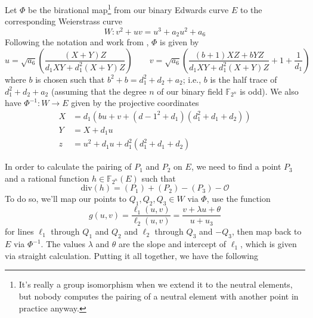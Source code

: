 Let $\Phi$ be the birational map\footnote{It's really a group isomorphism when
    we extend it to the neutral elements, but nobody computes the pairing of a
    neutral element with another point in practice anyway.} from our binary
    Edwards curve $E$ to the corresponding Weierstrass curve
\[
W: v^2 + uv = u^3 + a_2u^2 + a_6
\]
Following the notation and work from \cite{moloneyefficient}, $\Phi$ is given
    by
\[
u = \sqrt{a_6}\left(\frac{(X + Y) Z}{d_1XY + d_1^2(X + Y)Z}\right)
\qquad
v = \sqrt{a_6}\left(\frac{(b + 1)XZ + bYZ}{d_1XY + d_1^2(X + Y)Z} + 1 +
    \frac{1}{d_1}\right)
\]
    where $b$ is chosen such that $b^2 + b = d_1^2 + d_2 + a_2$; i.e., $b$ is
    the half trace of $d_1^2 + d_2 + a_2$ (assuming that the degree $n$ of our
    binary field $\mathbb{F}_{2^n}$ is odd).
We also have $\Phi^{-1}: W \to E$ given by the projective coordinates
\begin{align*}
X   &=  d_1(bu + v + (d-1^2 + d_1)(d_1^2 + d_1 + d_2))\\
Y   &=  X + d_1u\\
z   &=  u^2 + d_1u + d_1^2(d_1^2 + d_1 + d_2)
\end{align*}

In order to calculate the pairing of $P_1$ and $P_2$ on $E$, we need to find a
    point $P_3$ and a rational function $h \in \mathbb{F}_{2^n}(E)$ such that
\[
\textrm{div}(h) = (P_1) + (P_2) - (P_3) - \mathcal{O}
\]
To do so, we'll map our points to $Q_1, Q_2, Q_3 \in W$ via $\Phi$, use the
    function
\[
g(u, v)
    =   \frac{\ell_1(u, v)}{\ell_2(u, v)}
    =   \frac{v + \lambda u + \theta}{u + u_3}
\]
    for lines $\ell_1$ through $Q_1$ and $Q_2$ and $\ell_2$ through $Q_3$ and
    $-Q_3$, then map back to $E$ via $\Phi^{-1}$.
The values $\lambda$ and $\theta$ are the slope and intercept of $\ell_1$,
    which is given via straight calculation.
Putting it all together, we have the following

